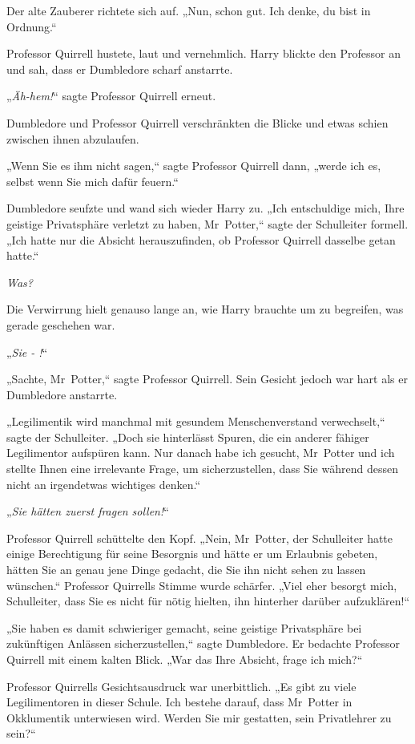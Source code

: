 {Der alte Zauberer richtete sich auf. „Nun, schon gut. Ich denke, du bist in Ordnung.“

Professor Quirrell hustete, laut und vernehmlich. Harry blickte den Professor an und sah, dass er Dumbledore scharf anstarrte.

„\emph{Äh-hem!}“ sagte Professor Quirrell erneut.

Dumbledore und Professor Quirrell verschränkten die Blicke und etwas schien zwischen ihnen abzulaufen.

„Wenn Sie es ihm nicht sagen,“ sagte Professor Quirrell dann, „werde ich es, selbst wenn Sie mich dafür feuern.“

Dumbledore seufzte und wand sich wieder Harry zu. „Ich entschuldige mich, Ihre geistige Privatsphäre verletzt zu haben, Mr~Potter,“ sagte der Schulleiter formell. „Ich hatte nur die Absicht herauszufinden, ob Professor Quirrell dasselbe getan hatte.“

\emph{Was?}

Die Verwirrung hielt genauso lange an, wie Harry brauchte um zu begreifen, was gerade geschehen war.

„\emph{Sie - !}“

„Sachte, Mr~Potter,“ sagte Professor Quirrell. Sein Gesicht jedoch war hart als er Dumbledore anstarrte.

„Legilimentik wird manchmal mit gesundem Menschenverstand verwechselt,“ sagte der Schulleiter. „Doch sie hinterlässt Spuren, die ein anderer fähiger Legilimentor aufspüren kann. Nur danach habe ich gesucht, Mr~Potter und ich stellte Ihnen eine irrelevante Frage, um sicherzustellen, dass Sie während dessen nicht an irgendetwas wichtiges denken.“

„\emph{Sie hätten zuerst fragen sollen!}“

Professor Quirrell schüttelte den Kopf. „Nein, Mr~Potter, der Schulleiter hatte einige Berechtigung für seine Besorgnis und hätte er um Erlaubnis gebeten, hätten Sie an genau jene Dinge gedacht, die Sie ihn nicht sehen zu lassen wünschen.“ Professor Quirrells Stimme wurde schärfer. „Viel eher besorgt mich, Schulleiter, dass Sie es nicht für nötig hielten, ihn hinterher darüber aufzuklären!“

„Sie haben es damit schwieriger gemacht, seine geistige Privatsphäre bei zukünftigen Anlässen sicherzustellen,“ sagte Dumbledore. Er bedachte Professor Quirrell mit einem kalten Blick. „War das Ihre Absicht, frage ich mich?“

Professor Quirrells Gesichtsausdruck war unerbittlich. „Es gibt zu viele Legilimentoren in dieser Schule. Ich bestehe darauf, dass Mr~Potter in Okklumentik unterwiesen wird. Werden Sie mir gestatten, sein Privatlehrer zu sein?“

}
